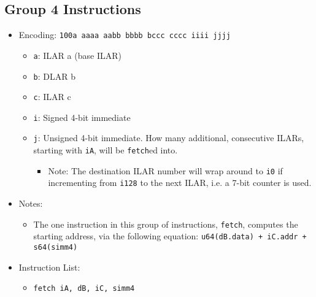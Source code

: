 \documentclass{article}
\begin{document}
	\subsection{Group 4 Instructions}
		\begin{itemize}
		\item Encoding:  \texttt{100a aaaa aabb bbbb  bccc cccc iiii jjjj}
			\begin{itemize}
			\item \texttt{a}:  ILAR a (base ILAR)
			\item \texttt{b}:  DLAR b
			\item \texttt{c}:  ILAR c
			\item \texttt{i}:  Signed 4-bit immediate
			\item \texttt{j}:  Unsigned 4-bit immediate.  How many
				additional, consecutive ILARs, starting with \texttt{iA},
				will be \texttt{fetch}ed into.
				\begin{itemize}
				\item Note:  The destination ILAR number will wrap around
					to \texttt{i0} if incrementing from \texttt{i128} to
					the next ILAR, i.e. a 7-bit counter is used.
				\end{itemize}
			\end{itemize}
		\item Notes:
			\begin{itemize}
			\item The one instruction in this group of instructions,
				\texttt{fetch}, computes the starting address, via the
				following equation:  \texttt{u64(dB.data) + iC.addr
					+ s64(simm4)}
			\end{itemize}
		\item Instruction List:
			\begin{itemize}
			\item \texttt{fetch iA, dB, iC, simm4}
			\end{itemize}
		\end{itemize}
\end{document}
